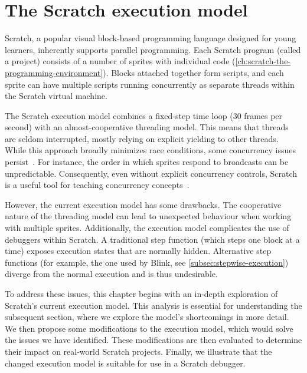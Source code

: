 \documentclass[../main]{subfiles}
\begin{document}
\chapter{The Scratch execution model}\label{ch:scratch-execution-model}


Scratch, a popular visual block-based programming language designed for young learners, inherently supports parallel programming.
Each Scratch program (called a project) consists of a number of sprites with individual code (\cref{ch:scratch-the-programming-environment}).
Blocks attached together form scripts, and each sprite can have multiple scripts running concurrently as separate threads within the Scratch virtual machine.

The Scratch execution model combines a fixed-step time loop (30 frames per second) with an almost-cooperative threading model.
This means that threads are seldom interrupted, mostly relying on explicit yielding to other threads.
While this approach broadly minimizes race conditions, some concurrency issues persist~\autocite{maloneyScratchProgrammingLanguage2010a}.
For instance, the order in which sprites respond to broadcasts can be unpredictable.
Consequently, even without explicit concurrency controls, Scratch is a useful tool for teaching concurrency concepts~\autocite{fatourouTeachingConcurrentProgramming2018}.

However, the current execution model has some drawbacks.
The cooperative nature of the threading model can lead to unexpected behaviour when working with multiple sprites.
Additionally, the execution model complicates the use of debuggers within Scratch.
A traditional step function (which steps one block at a time) exposes execution states that are normally hidden.
Alternative step functions (for example, the one used by Blink, see \cref{subsec:stepwise-execution}) diverge from the normal execution and is thus undesirable.

To address these issues, this chapter begins with an in-depth exploration of Scratch's current execution model.
This analysis is essential for understanding the subsequent section, where we explore the model's shortcomings in more detail.
We then propose some modifications to the execution model, which would solve the issues we have identified.
These modifications are then evaluated to determine their impact on real-world Scratch projects.
Finally, we illustrate that the changed execution model is suitable for use in a Scratch debugger.
\end{document}
